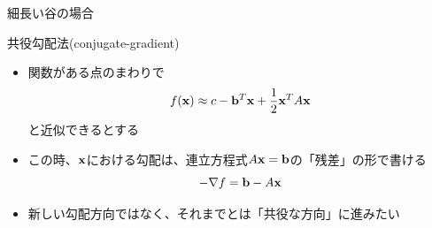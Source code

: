 \documentclass[dvipdfmx]{beamer}
\begin{document}
\begin{frame}[t,fragile]{細長い谷の場合}
  \vspace*{1em}
  \hspace*{1em}

  \vspace*{-2em}
  \hspace*{20em}{\footnotesize(Press et al 1988)}
\end{frame}

\begin{frame}[t,fragile]{共役勾配法(conjugate-gradient)}
  \begin{itemize}
    \setlength{\itemsep}{1em}
  \item 関数がある点のまわりで
    \[
    f({\bf x}) \approx c - {\bf b}^T {\bf x} + \frac{1}{2} {\bf x}^T A {\bf x}
    \]
    と近似できるとする
  \item この時、${\bf x}$における勾配は、連立方程式$A{\bf x}={\bf b}$の「残差」の形で書ける
    \[
    -\nabla f = {\bf b} - A {\bf x}
    \]
  \item 新しい勾配方向ではなく、それまでとは「共役な方向」に進みたい
  \end{itemize}
\end{frame}
\end{document}
